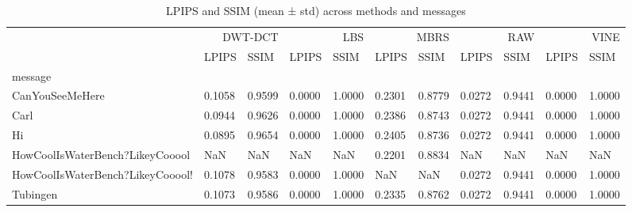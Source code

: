 \begin{table}
\caption{LPIPS and SSIM (mean ± std) across methods and messages}
\label{tab:lpips_ssim_by_message}
\begin{tabular}{lllllllllll}
\toprule
 & \multicolumn{2}{r}{DWT-DCT} & \multicolumn{2}{r}{LBS} & \multicolumn{2}{r}{MBRS} & \multicolumn{2}{r}{RAW} & \multicolumn{2}{r}{VINE} \\
 & LPIPS & SSIM & LPIPS & SSIM & LPIPS & SSIM & LPIPS & SSIM & LPIPS & SSIM \\
message &  &  &  &  &  &  &  &  &  &  \\
\midrule
CanYouSeeMeHere & 0.1058 & 0.9599 & 0.0000 & 1.0000 & 0.2301 & 0.8779 & 0.0272 & 0.9441 & 0.0000 & 1.0000 \\
Carl & 0.0944 & 0.9626 & 0.0000 & 1.0000 & 0.2386 & 0.8743 & 0.0272 & 0.9441 & 0.0000 & 1.0000 \\
Hi & 0.0895 & 0.9654 & 0.0000 & 1.0000 & 0.2405 & 0.8736 & 0.0272 & 0.9441 & 0.0000 & 1.0000 \\
HowCoolIsWaterBench?LikeyCooool & NaN & NaN & NaN & NaN & 0.2201 & 0.8834 & NaN & NaN & NaN & NaN \\
HowCoolIsWaterBench?LikeyCooool! & 0.1078 & 0.9583 & 0.0000 & 1.0000 & NaN & NaN & 0.0272 & 0.9441 & 0.0000 & 1.0000 \\
Tubingen & 0.1073 & 0.9586 & 0.0000 & 1.0000 & 0.2335 & 0.8762 & 0.0272 & 0.9441 & 0.0000 & 1.0000 \\
\bottomrule
\end{tabular}
\end{table}
